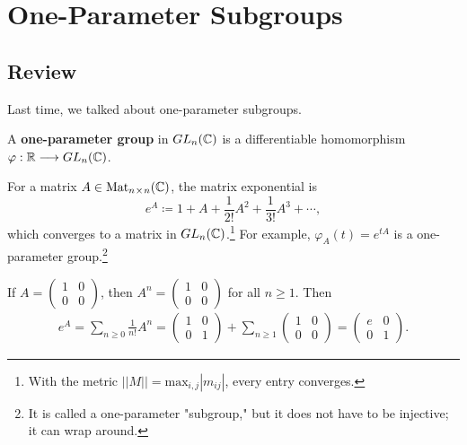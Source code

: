 
\section{One-Parameter Subgroups}

\subsection{Review}
Last time, we talked about one-parameter subgroups. 
\begin{definition}
A \textbf{one-parameter group} in $GL_n(\mathbb C)$ is a differentiable homomorphism $\varphi: \mathbb R \longrightarrow GL_n(\mathbb C)$. 
\end{definition}

For a matrix $A \in \text{Mat}_{n \hspace{0.05em}{\times}\hspace{0.05em} n}(\mathbb C)$, the matrix exponential is 
\[
e^A \coloneqq 1 + A + \frac{1}{2!}A^2 + \frac{1}{3!}A^3 + \cdots,
\]
which converges to a matrix in $GL_n(\mathbb C)$.\footnote{With the metric $||M|| = \text{max}_{i, j}|m_{ij}|$, every entry converges.} For example, $\varphi_A(t) = e^{tA}$ is a one-parameter group.\footnote{It is called a one-parameter "subgroup," but it does not have to be injective; it can wrap around.}

\begin{example}
If $A = \begin{pmatrix}1 & 0 \\0 & 0 \end{pmatrix}$, then $A^n = \begin{pmatrix} 1 & 0 \\ 0 & 0 \end{pmatrix}$ for all $n \geq 1.$ Then 
\begin{align*}
e^A = \sum_{n \geq 0} \frac{1}{n!}A^n = \begin{pmatrix} 1 & 0 \\ 0 & 1 \end{pmatrix} + \sum_{n \geq 1} \begin{pmatrix} 1 & 0 \\ 0 & 0 \end{pmatrix} = \begin{pmatrix} e & 0 \\ 0 & 1 \end{pmatrix}.
\end{align*}
\end{example}

